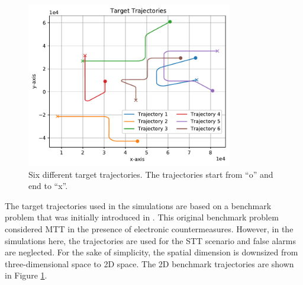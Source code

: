 \documentclass[english, 12pt, a4paper, elec, utf8, a-1b, online]{aaltothesis}
\numberwithin{equation}{section}
\begin{document}
\begin{figure}
    \centering
    \includegraphics[width=0.8\textwidth]{figures/benchmark/trajectories.pdf}
    \caption{Six different target trajectories. The trajectories start from ``o'' and end to ``x''.}
    \label{fig:benchmark_trajectories}
\end{figure}

The target trajectories used in the simulations are based on a benchmark problem that was initially introduced in \cite{Blair1998}.
This original benchmark problem considered MTT in the presence of electronic countermeasures.
However, in the simulations here, the trajectories are used for the STT scenario and false alarms are neglected.
For the sake of simplicity, the spatial dimension is downsized from three-dimensional space to 2D space.
The 2D benchmark trajectories are shown in Figure \ref{fig:benchmark_trajectories}.
\end{document}
